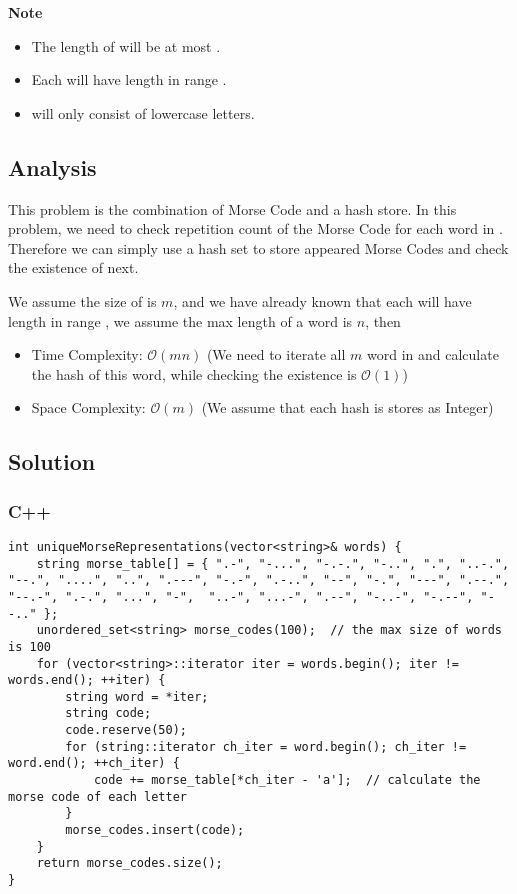 \textbf{Note}
\begin{itemize}
    \item The length of  will be at most .
    \item Each  will have length in range \inlinecode{[1, 12]}.
    \item {} will only consist of lowercase letters.
\end{itemize}

\subsection*{Analysis}
This problem is the combination of Morse Code and a hash store. In this problem, we need to check repetition count of the Morse Code for each word in . Therefore we can simply use a hash set to store appeared Morse Codes and check the existence of next.

We assume the size of  is $m$, and we have already known that each  will have length in range \inlinecode{[1, 12]}, we assume the max length of a word is $n$, then
\begin{itemize}
\item Time Complexity: $\mathcal{O}(mn)$ (We need to iterate all $m$ word in  and calculate the hash of this word, while checking the existence is $\mathcal{O}(1)$)
\item Space Complexity: $\mathcal{O}(m)$ (We assume that each hash is stores as Integer)
\end{itemize}

\subsection*{Solution}
\subsubsection*{C++}
\begin{verbatim}
int uniqueMorseRepresentations(vector<string>& words) {
    string morse_table[] = { ".-", "-...", "-.-.", "-..", ".", "..-.", "--.", "....", "..", ".---", "-.-", ".-..", "--", "-.", "---", ".--.", "--.-", ".-.", "...", "-",  "..-", "...-", ".--", "-..-", "-.--", "--.." };
    unordered_set<string> morse_codes(100);  // the max size of words is 100
    for (vector<string>::iterator iter = words.begin(); iter != words.end(); ++iter) {
        string word = *iter;
        string code;
        code.reserve(50);
        for (string::iterator ch_iter = word.begin(); ch_iter != word.end(); ++ch_iter) {
            code += morse_table[*ch_iter - 'a'];  // calculate the morse code of each letter
        }
        morse_codes.insert(code);
    }
    return morse_codes.size();
}
\end{verbatim}

\newpage

